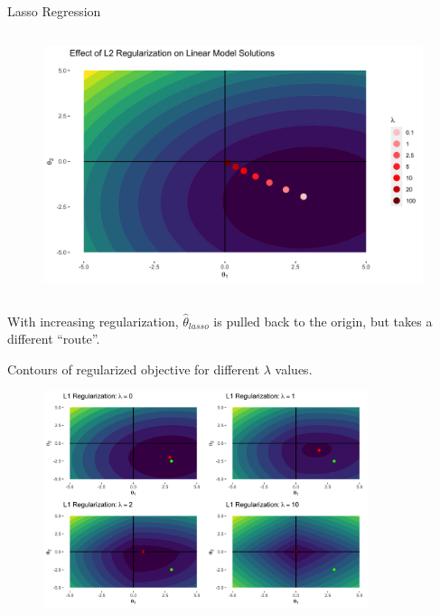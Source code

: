 \documentclass[11pt,compress,t,notes=noshow, xcolor=table]{beamer}
\begin{document}
\begin{vbframe}{Lasso Regression}
\begin{columns}
\begin{column}{0.5\textwidth}
\lz
\begin{figure}
\includegraphics[width=0.99\textwidth]{figure/lin_reg_l2.png}
\end{figure}
\end{column}
\end{columns}



With increasing regularization, $\hat{\theta}_{\textit{lasso}}$ is pulled back to the origin, but takes a different ``route''.


\framebreak 

Contours of regularized objective for different $\lambda$ values.
\begin{figure}
\includegraphics[width=0.85\textwidth]{figure/lasso_contours.png}
\end{figure}


\end{vbframe}
\end{document}
